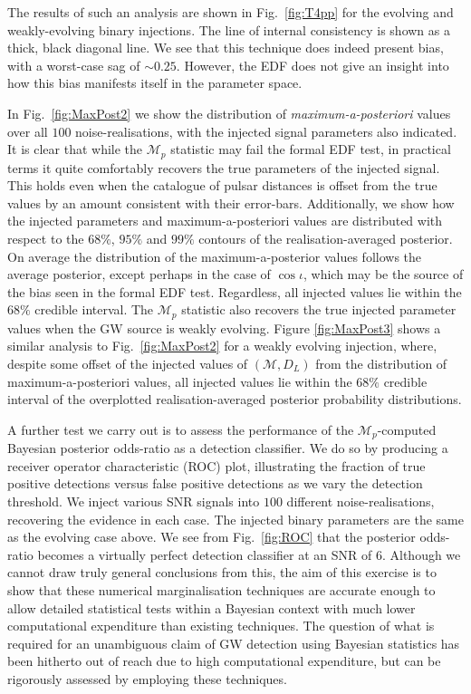 \documentclass[prd,twocolumn,showpacs,nofootinbib]{revtex4}
\begin{document}
The results of such an analysis are shown in Fig.\ \ref{fig:T4pp} for the evolving and weakly-evolving binary injections. The line of internal consistency is shown as a thick, black diagonal line. We see that this technique does indeed present bias, with a worst-case sag of $\sim 0.25$. However, the EDF does not give an insight into how this bias manifests itself in the parameter space. 

In Fig.\ \ref{fig:MaxPost2} we show the distribution of {\it maximum-a-posteriori} values over all $100$ noise-realisations, with the injected signal parameters also indicated. It is clear that while the {\bf $\mathcal{M}_p$} statistic may fail the formal EDF test, in practical terms it quite comfortably recovers the true parameters of the injected signal. This holds even when the catalogue of pulsar distances is offset from the true values by an amount consistent with their error-bars. Additionally, we show how the injected parameters and maximum-a-posteriori values are distributed with respect to the $68\%$, $95\%$ and $99\%$ contours of the realisation-averaged posterior. On average the distribution of the maximum-a-posterior values follows the average posterior, except perhaps in the case of $\cos\iota$, which may be the source of the bias seen in the formal EDF test. Regardless, all injected values lie within the $68\%$ credible interval. %
The {\bf $\mathcal{M}_p$} statistic also recovers the true injected parameter values when the GW source is weakly evolving. Figure \ref{fig:MaxPost3} shows a similar analysis to Fig.\ \ref{fig:MaxPost2} for a weakly evolving injection, where, despite some offset of the injected values of $(\mathcal{M},D_L)$ from the distribution of maximum-a-posteriori values, all injected values lie within the $68\%$ credible interval of the overplotted realisation-averaged posterior probability distributions.

A further test we carry out is to assess the performance of the $\mathcal{M}_p$-computed Bayesian posterior odds-ratio as a detection classifier. We do so by producing a receiver operator characteristic (ROC) plot, illustrating the fraction of true positive detections versus false positive detections as we vary the detection threshold. We inject various SNR signals into $100$ different noise-realisations, recovering the evidence in each case. The injected binary parameters are the same as the evolving case above. We see from Fig.\ \ref{fig:ROC} that the posterior odds-ratio becomes a virtually perfect detection classifier at an SNR of $6$. Although we cannot draw truly general conclusions from this, the aim of this exercise is to show that these numerical marginalisation techniques are accurate enough to allow detailed statistical tests within a Bayesian context with much lower computational expenditure than existing techniques. The question of what is required for an unambiguous claim of GW detection using Bayesian statistics has been hitherto out of reach due to high computational expenditure, but can be rigorously assessed by employing these techniques.
\end{document}
